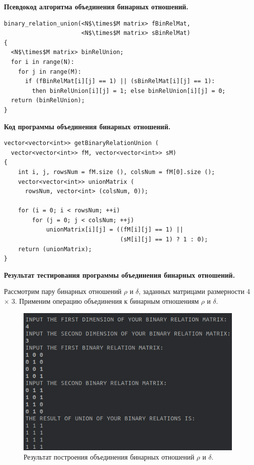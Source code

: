 \documentclass[spec, och, otchet, hidelinks]{SCWorks}
\newcommand{\tbf}[1]{\textbf{#1}}
\begin{document}
\par \tbf{Псевдокод алгоритма объединения бинарных отношений.}

\begin{lstlisting}[caption=Псевдокод алгоритма., mathescape]
binary_relation_union(<N$\times$M matrix> fBinRelMat,
                      <N$\times$M matrix> sBinRelMat)
{
  <N$\times$M matrix> binRelUnion;
  for i in range(N):
    for j in range(M):
      if (fBinRelMat[i][j] == 1) || (sBinRelMat[i][j] == 1):
        then binRelUnion[i][j] = 1; else binRelUnion[i][j] = 0;
  return (binRelUnion);
}
\end{lstlisting}

\par \tbf{Код программы объединения бинарных отношений.}
\begin{lstlisting}[caption=Код программы., mathescape]
vector<vector<int>> getBinaryRelationUnion (
  vector<vector<int>> fM, vector<vector<int>> sM)
{
    int i, j, rowsNum = fM.size (), colsNum = fM[0].size ();
    vector<vector<int>> unionMatrix (
      rowsNum, vector<int> (colsNum, 0));

    for (i = 0; i < rowsNum; ++i)
        for (j = 0; j < colsNum; ++j)
            unionMatrix[i][j] = ((fM[i][j] == 1) || 
                                 (sM[i][j] == 1) ? 1 : 0);
    return (unionMatrix);
}
\end{lstlisting}

\par \tbf{Результат тестирования программы объединения бинарных отношений.}
\par Рассмотрим пару бинарных отношений $\rho$ и $\delta$, заданных матрицами
размерности 4 $\times$ 3. Применим операцию объединения к бинарным отношениям
$\rho$ и $\delta$.
\begin{figure}[h]
  \center\includegraphics[scale=0.7]{binary_relation_union.png}
  \caption{Результат построения объединения бинарных отношений $\rho$ и $\delta$.}
\end{figure}
\end{document}
